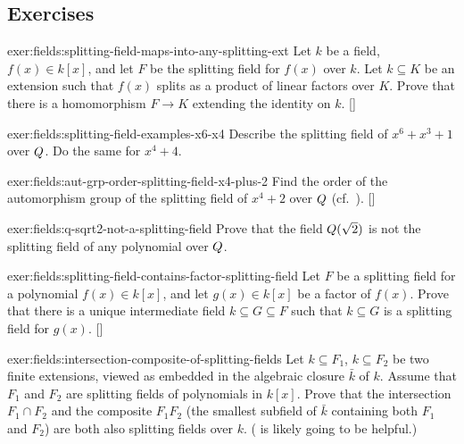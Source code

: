 \subsection*{Exercises}

\begin{exer}{}{exer:fields:splitting-field-maps-into-any-splitting-ext}
  Let $k$ be a field, $f(x) \in k[x]$, and let $F$ be the splitting
  field for $f(x)$ over $k$. Let $k \subseteq K$ be an extension such
  that $f(x)$ splits as a product of linear factors over $K$. Prove
  that there is a homomorphism $F \to K$ extending the identity on
  $k$. []
\end{exer}
\begin{exer}{}{exer:fields:splitting-field-examples-x6-x4}
  Describe the splitting field of $x^6 + x^3 + 1$ over $Q$. Do the
  same for $x^4 + 4$.
\end{exer}
\begin{exer}{}{exer:fields:aut-grp-order-splitting-field-x4-plus-2}
  Find the order of the automorphism group of the splitting field of
  $x^4 + 2$ over $Q$ (cf.\
  ). []
\end{exer}
\begin{exer}{}{exer:fields:q-sqrt2-not-a-splitting-field}
  Prove that the field $Q(\sqrt{2})$ is not the splitting field of
  any polynomial over $Q$.
\end{exer}
\begin{exer}{}{exer:fields:splitting-field-contains-factor-splitting-field}
  Let $F$ be a splitting field for a polynomial $f(x) \in k[x]$, and
  let $g(x) \in k[x]$ be a factor of $f(x)$. Prove that there is a
  unique intermediate field $k \subseteq G \subseteq F$ such
  that $k \subseteq G$ is a splitting field for
  $g(x)$. []
\end{exer}
\begin{exer}{}{exer:fields:intersection-composite-of-splitting-fields}
  Let $k \subseteq F_1$, $k \subseteq F_2$ be two finite extensions,
  viewed as embedded in the algebraic closure $\bar{k}$ of $k$. Assume
  that $F_1$ and $F_2$ are splitting fields of polynomials in
  $k[x]$. Prove that the intersection $F_1 \cap F_2$ and the composite
  $F_1 F_2$ (the smallest subfield of $\bar{k}$ containing both $F_1$
  and $F_2$) are both also splitting fields over
  $k$. ( is likely going to be helpful.)
\end{exer}
